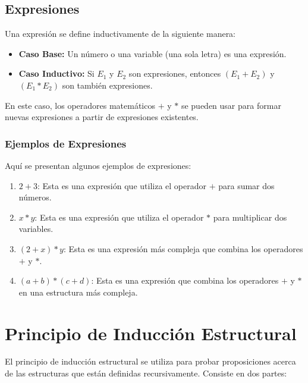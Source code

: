 \documentclass[11pt]{article}
\begin{document}
    \bigskip %

    \subsection{Expresiones}

    Una expresión se define inductivamente de la siguiente manera:

    \begin{itemize}
        \item \textbf{Caso Base:} Un número o una variable (una sola letra) es una expresión.
        \item \textbf{Caso Inductivo:} Si $E_1$ y $E_2$ son expresiones, entonces $(E_1 + E_2)$ y $(E_1 * E_2)$ son también expresiones.
    \end{itemize}

    En este caso, los operadores matemáticos $+$ y $*$ se pueden usar para formar nuevas expresiones a partir de expresiones existentes.

    \bigskip %

    \subsubsection{Ejemplos de Expresiones}

    Aquí se presentan algunos ejemplos de expresiones:

    \begin{enumerate}
        \item $2 + 3$: Esta es una expresión que utiliza el operador $+$ para sumar dos números.
        \item $x * y$: Esta es una expresión que utiliza el operador $*$ para multiplicar dos variables.
        \item $(2 + x) * y$: Esta es una expresión más compleja que combina los operadores $+$ y $*$.
        \item $(a + b) * (c + d)$: Esta es una expresión que combina los operadores $+$ y $*$ en una estructura más compleja.
    \end{enumerate}

    \bigskip %


    \section{Principio de Inducción Estructural}

    El principio de inducción estructural se utiliza para probar proposiciones acerca de las estructuras que están definidas recursivamente. Consiste en dos partes:
\end{document}
